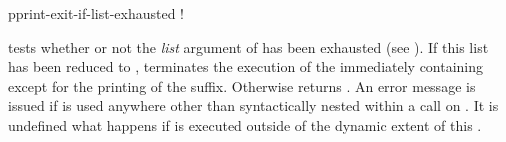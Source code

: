 \begin{defmac}
pprint-exit-if-list-exhausted \!!

 tests whether or not the {\it list}
argument of  has been exhausted (see
).  If this list has been reduced to ,
 terminates the execution of the
immediately containing  except for the printing of
the suffix.  Otherwise  returns .
An error message is issued if  is used
anywhere other than syntactically nested within a call on
.  It is undefined what happens if 
is executed outside of the dynamic extent of this
.
\end{defmac}

